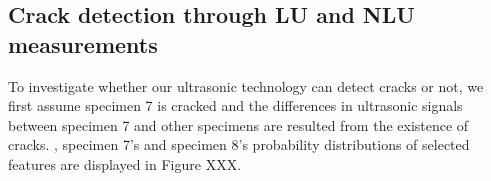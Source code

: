 \subsection{Crack detection through LU and NLU measurements}
To investigate whether our ultrasonic technology can detect cracks or not, we first assume specimen 7 is cracked and the differences in ultrasonic signals between specimen 7 and other specimens are resulted from the existence of cracks.
, specimen 7's and specimen 8's probability distributions of selected features are displayed in Figure XXX.